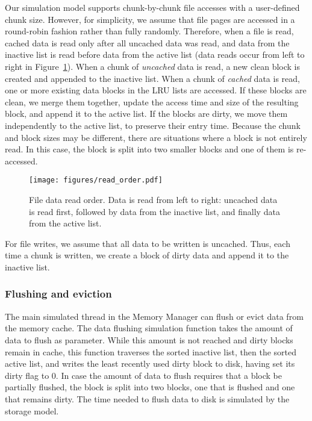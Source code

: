 \documentclass[conference]{IEEEtran}
\begin{document}
    Our simulation model supports chunk-by-chunk file accesses
    with a user-defined chunk size. However, for simplicity, we assume that file pages are
    accessed in a round-robin fashion rather than fully randomly.
    Therefore, when a file is read, cached data is read only after all uncached data was read, and data from the inactive list is read
    before data from the active list
    (data reads occur from left to right in Figure~\ref{fig:read_order}).
    When a chunk of \emph{uncached} data is read, a new clean block is created
    and appended to the inactive list.
    When a chunk of \emph{cached} data is read, one or more existing data blocks in the LRU lists are accessed.
    If these blocks are clean, we merge them together, update the access time and size of the resulting block,
    and append it to the active list.
    If the blocks are dirty, we move them independently to the active list, to preserve their entry time.
    Because the chunk and block sizes may be different, there are situations
    where a block is not entirely read.
    In this case, the block is split into two smaller blocks and one of them is re-accessed.
    \begin{figure}
           \centering
           \texttt{[image: figures/read\_order.pdf]}
           \caption{File data read order. Data is read from left to right: uncached data
           is read first, followed by data from the inactive list, and finally data from the active list. }
           \label{fig:read_order}
    \end{figure}

    For file writes, we assume that all data to be written is
    uncached. Thus, each time a chunk is written, we create a block of dirty data
    and append it to the inactive list.

    \subsubsection{Flushing and eviction}

    The main simulated thread in the Memory Manager can flush or evict data from the
    memory cache. The data flushing simulation
    function takes the amount of data to flush as parameter. While
    this amount is not reached and dirty
    blocks remain in cache, this function traverses the sorted
    inactive list, then the sorted active list, and writes the
    least recently used dirty block to disk, having set its dirty
    flag to 0. In case the amount of data to flush requires that a
    block be partially flushed, the block is split into two blocks,
    one that is flushed and one that remains dirty. The time needed
    to flush data to disk is simulated by the storage model.
\end{document}
